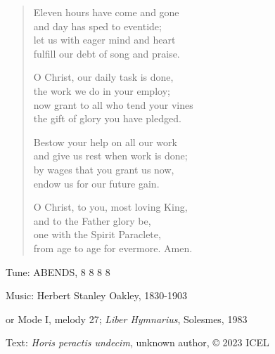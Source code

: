 \hymn

\begin{verse}
Eleven hours have come and gone\\
and day has sped to eventide;\\
let us with eager mind and heart\\
fulfill our debt of song and praise.

O Christ, our daily task is done,\\
the work we do in your employ;\\
now grant to all who tend your vines\\
the gift of glory you have pledged.

Bestow your help on all our work\\
and give us rest when work is done;\\
by wages that you grant us now,\\
endow us for our future gain.

O Christ, to you, most loving King,\\
and to the Father glory be,\\
one with the Spirit Paraclete,\\
from age to age for evermore. Amen.
\end{verse}

\begin{hymnsource}
Tune: ABENDS, 8 8 8 8

Music: Herbert Stanley Oakley, 1830-1903

or Mode I, melody 27; \emph{Liber Hymnarius}, Solesmes, 1983

Text: \emph{Horis peractis undecim}, unknown author, © 2023 ICEL
\end{hymnsource}